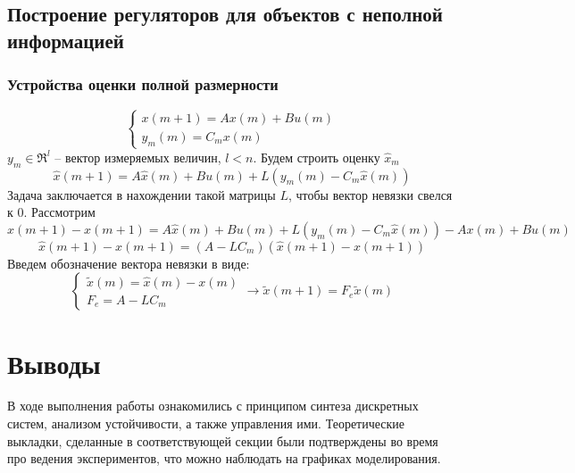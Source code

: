 \documentclass[a4paper, 14pt]{extarticle}
\theoremstyle{definition}
\theoremstyle{plain}
\theoremstyle{remark}
\begin{document}
\subsection{Построение регуляторов для объектов с неполной информацией}
\subsubsection{Устройства оценки полной размерности}
\[
\begin{cases}
	x(m+1) = A x(m) + B u(m) \\
	y_m(m) = C_m x(m)
\end{cases}
\]
\(y_m \in \Re^l\) -- вектор измеряемых величин, \(l < n\). 
Будем строить оценку \(\hat x_m\)
\[\hat x(m+1) = A \hat x(m) + B u(m) + L(y_m(m) - C_m \hat x(m))\]
Задача заключается в нахождении такой матрицы \(L\), чтобы вектор невязки свелся к 0. Рассмотрим
\[\hat x(m+1) - x(m+1) = A \hat x(m) + B u(m) + L(y_m(m) - C_m \hat x(m)) - A x(m) + B u(m)\]
\[\hat x(m+1) - x(m+1) = (A - LC_m)(\hat x(m+1) - x(m+1))\]
Введем обозначение вектора невязки в виде:
\[
\begin{cases}
	\tilde x(m) = \hat x(m) - x(m) \\
	F_e = A - LC_m
\end{cases} \rightarrow
	\tilde x(m+1) = F_e  \tilde x(m)
 \]










\newpage
\section{Выводы}
В ходе выполнения работы ознакомились с принципом синтеза дискретных систем, анализом устойчивости, а также управления ими. Теоретические выкладки, сделанные в соответствующей секции были подтверждены во время про ведения экспериментов, что можно наблюдать на графиках моделирования.
\end{document}
